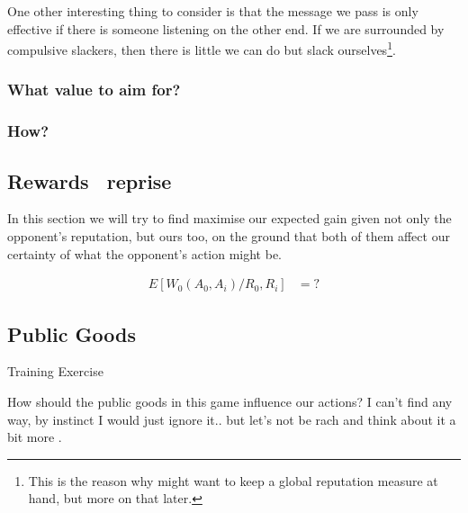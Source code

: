 \documentclass[10pt,fleqn]{article}
\begin{document}
One other interesting thing to consider is that the message we pass is only
effective if there is someone listening on the other end. If we are surrounded
by compulsive slackers, then there is little we can do but slack
ourselves\footnote{This is the reason why might want to keep a global reputation
measure at hand, but more on that later.}.


\subsubsection{What value to aim for?}

\subsubsection{How?}

\subsection{Rewards \dash\ reprise}

In this section we will try to find maximise our expected gain given not only the
opponent's reputation, but ours too, on the ground that both of them affect our
certainty of what the opponent's action might be.

\begin{align*}
  E[W_0(A_0, A_i) / R_0, R_i] &= ?
\end{align*}

\subsection{Public Goods}
\begin{quotation}
\end{quotation}
\hfill Training Exercise

How should the public goods in this game influence our actions? I can't find any
way, by instinct I would just ignore it.. but let's not be rach and think about
it a bit more \smiley.
\end{document}
